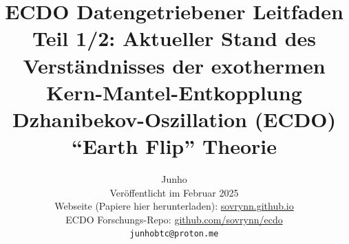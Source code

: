 \documentclass[10pt,twocolumn,letterpaper]{article}
\begin{document}
\title{ECDO Datengetriebener Leitfaden Teil 1/2: Aktueller Stand des Verständnisses der exothermen Kern-Mantel-Entkopplung Dzhanibekov-Oszillation (ECDO) “Earth Flip” Theorie}

\author{Junho\\
Veröffentlicht im Februar 2025\\
Webseite (Papiere hier herunterladen): \href{https://sovrynn.github.io}{sovrynn.github.io}\\
ECDO Forschungs-Repo: \href{https://github.com/sovrynn/ecdo}{github.com/sovrynn/ecdo}\\
{\tt\small junhobtc@proton.me}
}

\maketitle
\end{document}
